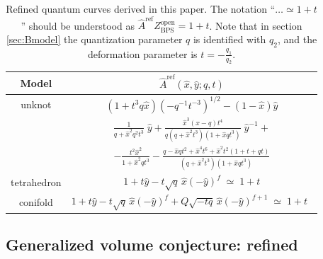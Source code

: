 \documentclass[hyper,letterpaper]{JHEP3}
\renewcommand{\hat}{\widehat}
\begin{document}
\begin{table}[h]
\centering
\begin{tabular}{|@{$\Bigm|$}c|c@{$\Bigm|$}|}
\hline
\rule{0pt}{5mm}
\textbf{Model} &  $\widehat{A}^{\text{ref}} (\hat{x},\hat{y};q,t)$ \\[3pt]
\hline
\hline
\rule{0pt}{5mm}
unknot &  $(1 + t^3 q \hat{x}) ( - q^{-1} t^{-3})^{1/2} - (1 - \hat{x})\hat y$ \\[3pt]
\hline
\rule{0pt}{5mm}
\multirow{2}{*}{trefoil}   &   $  \frac{1}{q + \hat{x}^2 q^{2} t^3} \; \hat{y}
+ \frac{\hat{x}^3 (x - q) t^4}{q (q + \hat{x}^2 t^3) (1 + \hat{x} q t^3)} \; \hat{y}^{-1} +   $    \\[3pt]
\rule{0pt}{5mm}
        &    $  -   \frac{t^2 \hat{x}^2}{1 + \hat{x}^2 q t^3} -
\frac{ q - \hat{x} q t^2 + \hat{x}^{4} t^6 +
  \hat{x}^{2} t^2 (1 + t + q t)}{(q + \hat{x}^{2} t^3) (1 + \hat{x} q t^3)}     $         \\[3pt]
\hline
\rule{0pt}{5mm}
tetrahedron & $1 + t \hat{y} - t \sqrt{q} \, \hat{x}(-\hat{y})^f  \; \simeq  \; 1 + t$ \\[3pt]
\hline
\rule{0pt}{5mm}
conifold &  $1 + t \hat{y} - t \sqrt{q} \, \hat{x}(-\hat{y})^f  + Q \sqrt{-tq} \, \hat{x}(-\hat{y})^{f+1} \; \simeq \; 1 + t$~ \\[3pt]
\hline
\end{tabular}
\caption{Refined quantum curves derived in this paper. The notation ``$\ldots \simeq 1 + t$'' should be understood as $\widehat{A}^{\text{ref}} Z_{\text{BPS}}^{\text{open}} = 1 + t$. Note that in section \protect\ref{sec:Bmodel} the quantization parameter $q$ is identified with $q_2$,
and the deformation parameter is $t= - \frac{q_1}{q_2}$. \label{table-qt} }
\end{table}



\subsection{Generalized volume conjecture: refined}
\end{document}
